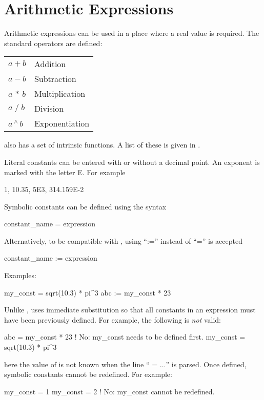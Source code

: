 {{{%
\section{Arithmetic Expressions}
\label{s:arith}

Arithmetic expressions can be used in a place where a real value is required.
The standard operators are defined: \hfil\break
\hspace*{0.15in}
\begin{tabular}{ll}
  $a + b$           & Addition        \\
  $a - b$           & Subtraction     \\
  $a \, \ast \, b$  & Multiplication  \\
  $a \; / \; b$     & Division        \\
  $a \, ^{\scriptstyle\wedge} \, b$ & Exponentiation  \\
\end{tabular}
\hfil\break
\bmad also has a set of intrinsic functions. A list of these is given
in .

Literal constants can be entered with or without a decimal point. An
exponent is marked with the letter E. For example
\begin{example}
  1, 10.35, 5E3, 314.159E-2
\end{example}
Symbolic constants can be defined using the syntax
\begin{example}
  constant_name = expression
\end{example}
Alternatively, to be compatible with \mad, using ``:='' instead of ``='' is accepted
\begin{example}
  constant_name := expression
\end{example}
Examples:
\begin{example}
  my_const = sqrt(10.3) * pi^3
  abc     := my_const * 23
\end{example}
Unlike \mad, \bmad uses immediate substitution so that all constants
in an expression must have been previously defined. For example, the
following is {\em not} valid:
\begin{example}
  abc      = my_const * 23      ! No: my_const needs to be defined first.
  my_const = sqrt(10.3) * pi^3
\end{example}
here the value of  is not known when the line ``
= $\ldots$'' is parsed. Once
defined, symbolic constants cannot be redefined. For example:
\begin{example}
  my_const = 1
  my_const = 2  ! No: my_const cannot be redefined.
\end{example}

}}}
